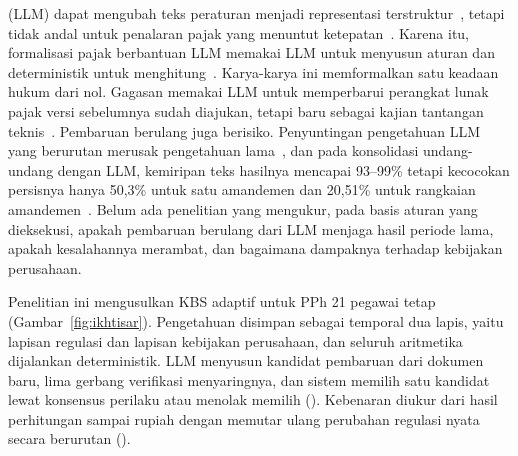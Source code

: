  (LLM) dapat mengubah teks peraturan menjadi representasi terstruktur~\cite{janatian2023texttostructure}, tetapi tidak andal untuk penalaran pajak yang menuntut ketepatan~\cite{blairstanek2023gpt3,nay2024taxattorneys}. Karena itu, formalisasi pajak berbantuan LLM memakai LLM untuk menyusun aturan dan  deterministik untuk menghitung~\cite{veeramani2026neurosymbolic,yadamsuren2026formalization,lorenzo2025translating,jurayj2026tax}. Karya-karya ini memformalkan satu keadaan hukum dari nol. Gagasan memakai LLM untuk memperbarui perangkat lunak pajak versi sebelumnya sudah diajukan, tetapi baru sebagai kajian tantangan teknis~\cite{goganikhiabani2025maintaining}. Pembaruan berulang juga berisiko. Penyuntingan pengetahuan LLM yang berurutan merusak pengetahuan lama~\cite{gupta2024forgetting}, dan pada konsolidasi undang-undang dengan LLM, kemiripan teks hasilnya mencapai 93--99\% tetapi kecocokan persisnya hanya 50,3\% untuk satu amandemen dan 20,51\% untuk rangkaian amandemen~\cite{prior2025risks}. Belum ada penelitian yang mengukur, pada basis aturan yang dieksekusi, apakah pembaruan berulang dari LLM menjaga hasil periode lama, apakah kesalahannya merambat, dan bagaimana dampaknya terhadap kebijakan perusahaan.

Penelitian ini mengusulkan KBS adaptif untuk PPh 21 pegawai tetap (Gambar~\ref{fig:ikhtisar}). Pengetahuan disimpan sebagai  temporal dua lapis, yaitu lapisan regulasi dan lapisan kebijakan perusahaan, dan seluruh aritmetika dijalankan  deterministik. LLM menyusun kandidat pembaruan dari dokumen baru, lima gerbang verifikasi menyaringnya, dan sistem memilih satu kandidat lewat konsensus perilaku atau menolak memilih (). Kebenaran diukur dari hasil perhitungan sampai rupiah dengan memutar ulang perubahan regulasi nyata secara berurutan ().

